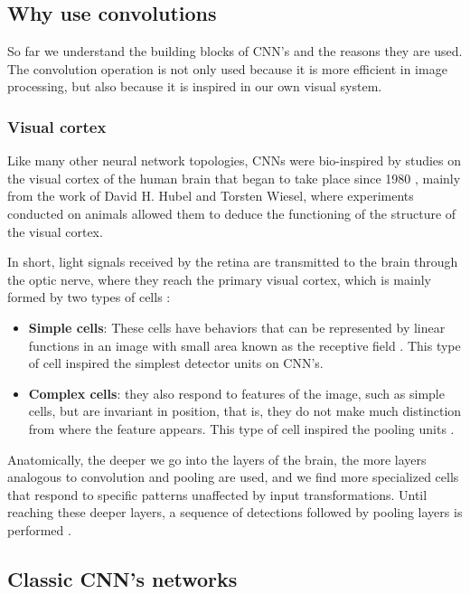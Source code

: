 \subsection{Why use convolutions}

So far we understand the building blocks of CNN's and the reasons they are used. The convolution operation is not only used because it is more efficient in image processing, but also because it is inspired in our own visual system.

\subsubsection{Visual cortex}

Like many other neural network topologies, CNNs were bio-inspired by studies on the visual cortex of the human brain that began to take place since 1980 \cite{geron2019}, mainly from the work of David H. Hubel and Torsten Wiesel, where experiments conducted on animals allowed them to deduce the functioning of the structure of the visual cortex.

In short, light signals received by the retina are transmitted to the brain through the optic nerve, where they reach the primary visual cortex, which is mainly formed by two types of cells \cite{goodfellow2016}:

\begin{itemize}
\item \textbf{Simple cells}: These cells have behaviors that can be represented by linear functions in an image with small area known as the receptive field \cite{goodfellow2016} \cite{geron2019}. This type of cell inspired the simplest detector units on CNN's.
\item \textbf{Complex cells}: they also respond to features of the image, such as simple cells, but are invariant in position, that is, they do not make much distinction from where the feature appears. This type of cell inspired the pooling units \cite{goodfellow2016}.
\end{itemize}

Anatomically, the deeper we go into the layers of the brain, the more layers analogous to convolution and pooling are used, and we find more specialized cells that respond to specific patterns unaffected by input transformations. Until reaching these deeper layers, a sequence of detections followed by pooling layers is performed \cite{goodfellow2016}. 

\subsection{Classic CNN's networks}


